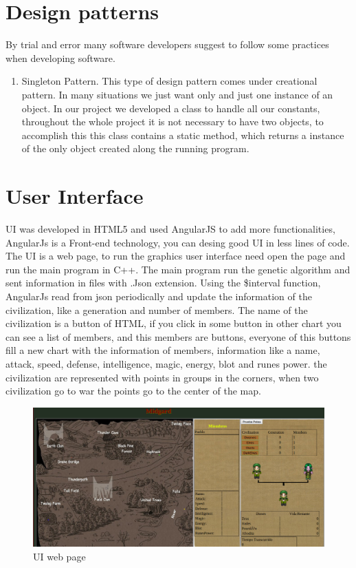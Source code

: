 \documentclass[twocolumn]{IEEEtran}
\begin{document}
\section{Design patterns}
	
    By trial and error many software developers suggest to follow some practices when developing software.
    \begin{enumerate}

	\item Singleton Pattern.
    This type of design pattern comes under creational pattern. In many situations we just want only and just one instance of an object. In our project we developed a class to handle all our constants, throughout the whole project it is not necessary to have two objects, to accomplish this this class contains a static method, which returns a instance of the only object created along the running program.    
	\end{enumerate}


\section{User Interface}
	
    UI was developed in HTML5 and used AngularJS to add more functionalities, AngularJs  is a Front-end technology, you can desing good UI in less lines of code. The UI is a web page, to run the graphics user interface need open the page and run the main program in C++. The main program run the genetic algorithm and sent  information in files with .Json extension. Using the \$interval function, AngularJs read from json periodically and update the information of the civilization, like a generation and number of members. The name of the civilization is a button of HTML, if you click in some button in other chart you can see a list of members, and this members are buttons, everyone of this buttons fill a new chart with the information of members, information like a name, attack, speed, defense, intelligence, magic, energy, blot and runes power. the civilization are represented with points in groups in the corners, when two civilization go to war the points go to the center of the map.
    \cite{37}
    \cite{38}
    \cite{39}
     \begin{figure}[h!]
    \centering
    \includegraphics[width=\columnwidth]{src/UI.jpg}
	\caption{UI web page}
    \label{fig:2n4096v}
    \end{figure}
\end{document}
